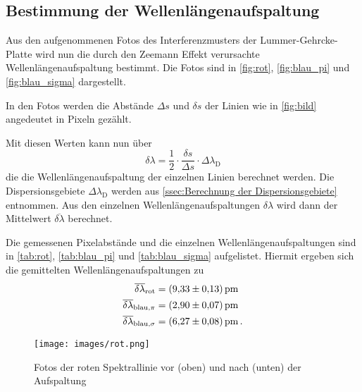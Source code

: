 \subsection{Bestimmung der Wellenlängenaufspaltung}
\label{ssec:Bestimmung der Wellenlängenaufspaltung}

Aus den aufgenommenen Fotos des Interferenzmusters der Lummer-Gehrcke-Platte wird nun die durch den Zeemann Effekt verursachte Wellenlängenaufspaltung bestimmt.
Die Fotos sind in \autoref{fig:rot}, \autoref{fig:blau_pi} und \autoref{fig:blau_sigma} dargestellt.

In den Fotos werden die Abstände $\Delta s$ und $\delta s$ der Linien wie in \autoref{fig:bild} angedeutet in Pixeln gezählt.

Mit diesen Werten kann nun über 
\begin{equation}
    \delta \lambda = \frac{1}{2}\cdot\frac{\delta s}{\Delta s}\cdot\Delta \lambda_\text{D}
    \label{eq:delta_lambda}
\end{equation}
die die Wellenlängenaufspaltung der einzelnen Linien berechnet werden.
Die Dispersionsgebiete $\Delta\lambda_\text{D}$ werden aus \autoref{ssec:Berechnung der Dispersionsgebiete} entnommen.
Aus den einzelnen Wellenlängenaufspaltungen $\delta \lambda$ wird dann der Mittelwert $\overline{\delta\lambda}$ berechnet.

Die gemessenen Pixelabstände und die einzelnen Wellenlängenaufspaltungen sind in \autoref{tab:rot}, \autoref{tab:blau_pi} und \autoref{tab:blau_sigma} aufgelistet.
Hiermit ergeben sich die gemittelten Wellenlängenaufspaltungen zu 
\begin{align*}
    \overline{\delta \lambda}_\text{rot} &= \SI{9.33+-0.13}{\pico\meter} \\
    \overline{\delta \lambda}_{\text{blau,}\pi} &= \SI{2.90+-0.07}{\pico\meter} \\
    \overline{\delta \lambda}_{\text{blau,}\sigma} &= \SI{6.27+-0.08}{\pico\meter} \, .
\end{align*}

\newpage

\begin{figure}[ht]
    \centering
    \texttt{[image: images/rot.png]}
    \caption{Fotos der roten Spektrallinie vor (oben) und nach (unten) der Aufspaltung}
    \label{fig:rot}
\end{figure}

